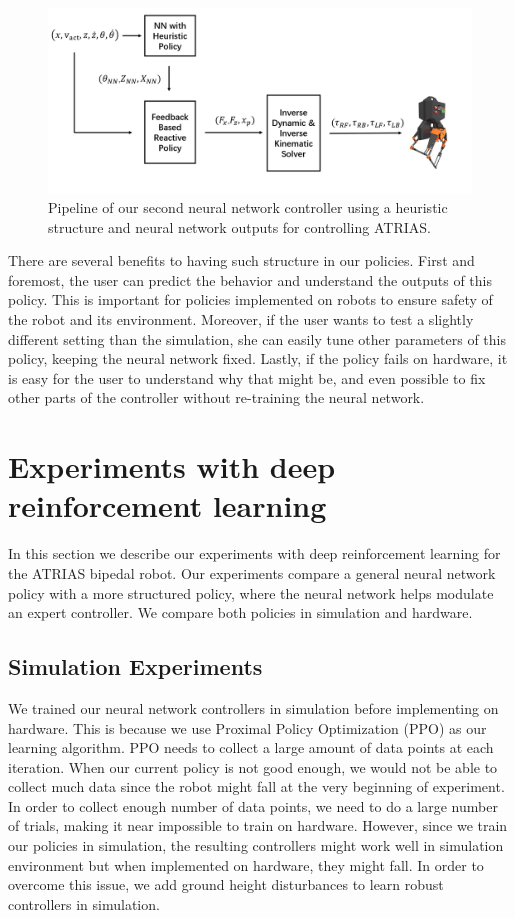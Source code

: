 \begin{figure}[!h]
	\centering
	\includegraphics[width=.7\textwidth]{./img/Heuristic.PNG}
    \caption{Pipeline of our second neural network controller using a heuristic structure and neural network outputs for controlling ATRIAS. }
    \label{fig:H_process}
\end{figure}

There are several benefits to having such structure in our policies. First and foremost, the user can predict the behavior and understand the outputs of this policy. This is important for policies implemented on robots to ensure safety of the robot and its environment. 
Moreover, if the user wants to test a slightly different setting than the simulation, she can easily tune other parameters of this policy, keeping the neural network fixed. Lastly, if the policy fails on hardware, it is easy for the user to understand why that might be, and even possible to fix other parts of the controller without re-training the neural network.


\section{Experiments with deep reinforcement learning}
In this section we describe our experiments with deep reinforcement learning for the ATRIAS bipedal robot. Our experiments compare a general neural network policy with a more structured policy, where the neural network helps modulate an expert controller. We compare both policies in simulation and hardware.

\subsection{Simulation Experiments}
We trained our neural network controllers in simulation before implementing on hardware. This is because we use Proximal Policy Optimization (PPO) as our learning algorithm. PPO needs to collect a large amount of data points at each iteration. When our current policy is not good enough, we would not be able to collect much data since the robot might fall at the very beginning of experiment. In order to collect enough number of data points, we need to do a large number of trials, making it near impossible to train on hardware. However, since we train our policies in simulation, the resulting controllers might work well in simulation environment but when implemented on hardware, they might fall. In order to overcome this issue, we add ground height disturbances to learn robust controllers in simulation. %

